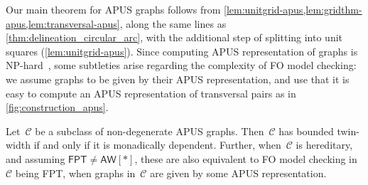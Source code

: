 \documentclass[a4paper,UKenglish,cleveref,thm-restate]{lipics-v2021}
\theoremstyle{remark}
\newcommand{\Cc}{\mathcal{C}}
\newcommand{\fpt}{\ensuremath{\mathsf{FPT}}\xspace}
\newcommand{\aw}{\ensuremath{\mathsf{AW}[*]}\xspace}
\begin{document}
Our main theorem for APUS graphs follows from \cref{lem:unitgrid-apus,lem:gridthm-apus,lem:transversal-apus}, along the same lines as \cref{thm:delineation_circular_arc},
with the additional step of splitting into unit squares (\cref{lem:unitgrid-apus}).
Since computing APUS representation of graphs is NP-hard~\cite{mustata2013unitgrid},
some subtleties arise regarding the complexity of FO model checking:
we assume graphs to be given by their APUS representation,
and use that it is easy to compute an APUS representation of transversal pairs as in \cref{fig:construction_apus}.%
\begin{theorem}\label{thm:delineation-apus}
    Let~$\Cc$ be a subclass of non-degenerate APUS graphs.
    Then~$\Cc$ has bounded twin-width if and only if it is monadically dependent.
    Further, when~$\Cc$ is hereditary, and assuming $\fpt \neq \aw$,
    these are also equivalent to FO model checking in~$\Cc$ being FPT, when graphs in~$\Cc$ are given by some APUS representation.
\end{theorem}
\end{document}
